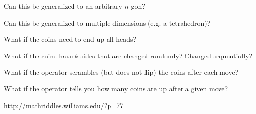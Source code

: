 \documentclass{article}
\begin{document}
\begin{related}
  \item Can this be generalized to an arbitrary $n$-gon?
  \item Can this be generalized to multiple dimensions (e.g. a tetrahedron)?
  \item What if the coins need to end up all heads?
  \item What if the coins have $k$ sides that are changed randomly?
    Changed sequentially?
  \item What if the operator scrambles (but does not flip) the coins after each
    move?
  \item What if the operator tells you how many coins are up after a given move?
\end{related}

\begin{references}
  \item \url{http://mathriddles.williams.edu/?p=77}
\end{references}
\end{document}
